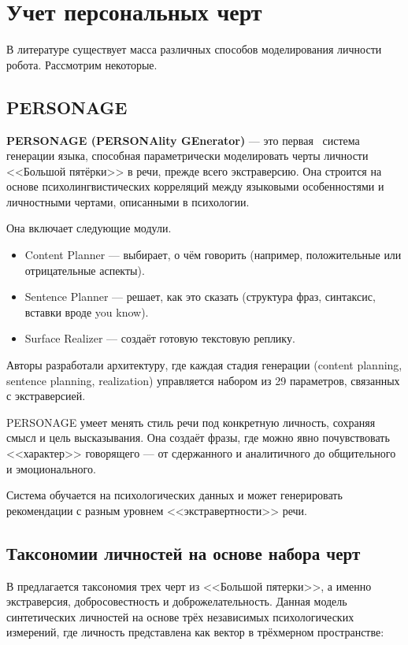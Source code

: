 \chapter{Учет персональных черт}

В литературе существует масса различных способов моделирования личности робота. Рассмотрим некоторые.

\section{PERSONAGE}

\textbf{PERSONAGE (PERSONAlity GEnerator)} --- это первая~\cite{} система генерации языка, способная параметрически моделировать черты личности <<Большой пятёрки>> в речи, прежде всего экстраверсию.
Она строится на основе психолингвистических корреляций между языковыми особенностями и личностными чертами, описанными в психологии.

Она включает следующие модули.

\begin{itemize}
	\item Content Planner --- выбирает, о чём говорить (например, положительные или отрицательные аспекты).
	
	\item Sentence Planner --- решает, как это сказать (структура фраз, синтаксис, вставки вроде you know).
	
	\item Surface Realizer --- создаёт готовую текстовую реплику.
\end{itemize}

Авторы разработали архитектуру, где каждая стадия генерации (content planning, sentence planning, realization) управляется набором из 29 параметров, связанных с экстраверсией.

PERSONAGE умеет менять стиль речи под конкретную личность, сохраняя смысл и цель высказывания. Она создаёт фразы, где можно явно почувствовать <<характер>> говорящего --- от сдержанного и аналитичного до общительного и эмоционального.

Система обучается на психологических данных и может генерировать рекомендации с разным уровнем <<экстравертности>> речи.


\section{Таксономии личностей на основе набора черт}

В \cite{Recchiuto2023SoftwareFramework} предлагается таксономия трех черт из <<Большой пятерки>>, а именно экстраверсия, добросовестность и доброжелательность. 
Данная модель синтетических личностей на основе трёх независимых психологических измерений, где личность представлена как вектор в трёхмерном пространстве: %

